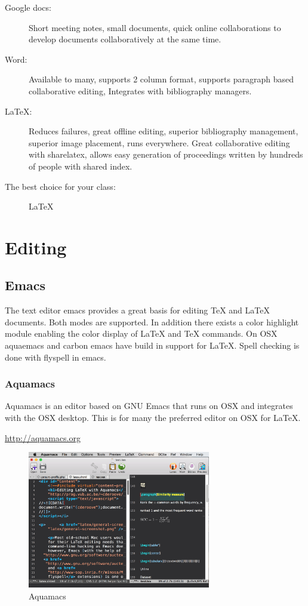 \begin{description}
\item[Google docs:]
Short meeting notes, small documents, quick online collaborations to
develop documents collaboratively at the same time.
\item[Word:]
Available to many, supports 2 column format, supports paragraph based
collaborative editing, Integrates with bibliography managers.
\item[LaTeX:]
Reduces failures, great offline editing, superior bibliography
management, superior image placement, runs everywhere. Great
collaborative editing with sharelatex, allows easy generation of
proceedings written by hundreds of people with shared index.
\item[The best choice for your class:]
LaTeX
\end{description}

\section{Editing}\label{editing}

\subsection{Emacs}\label{emacs}

The text editor emacs provides a great basis for editing TeX and LaTeX
documents. Both modes are supported. In addition there exists a color
highlight module enabling the color display of LaTeX and TeX commands.
On OSX aquaemacs and carbon emacs have build in support for LaTeX. Spell
checking is done with flyspell in emacs.

\subsubsection{Aquamacs}

Aquamacs is an editor based on GNU Emacs that runs on OSX and
integrates with the OSX desktop. This is for many the preferred editor
on OSX for \LaTeX.

\url{http://aquamacs.org}

\begin{figure}[!htb]
  \centering\includegraphics[width=8cm]{images/aquamacs.png}
  \caption{Aquamacs}
  \label{F:aquamacs}
\end{figure}


